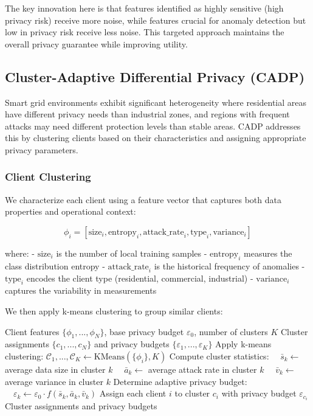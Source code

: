 \documentclass{ieeeaccess}
\theoremstyle{definition}
\begin{document}
The key innovation here is that features identified as highly sensitive (high privacy risk) receive more noise, while features crucial for anomaly detection but low in privacy risk receive less noise. This targeted approach maintains the overall privacy guarantee while improving utility.

\subsection{Cluster-Adaptive Differential Privacy (CADP)}

Smart grid environments exhibit significant heterogeneity where residential areas have different privacy needs than industrial zones, and regions with frequent attacks may need different protection levels than stable areas. CADP addresses this by clustering clients based on their characteristics and assigning appropriate privacy parameters.

\subsubsection{Client Clustering}

We characterize each client using a feature vector that captures both data properties and operational context:

\begin{equation}
\phi_i = [\text{size}_i, \text{entropy}_i, \text{attack\_rate}_i, \text{type}_i, \text{variance}_i]
\end{equation}

where:
- $\text{size}_i$ is the number of local training samples
- $\text{entropy}_i$ measures the class distribution entropy
- $\text{attack\_rate}_i$ is the historical frequency of anomalies
- $\text{type}_i$ encodes the client type (residential, commercial, industrial)
- $\text{variance}_i$ captures the variability in measurements

We then apply k-means clustering to group similar clients:

\begin{algorithm}
\caption{Cluster-Adaptive Privacy Assignment}
\label{alg:cadp}
\begin{algorithmic}[1]
\REQUIRE Client features $\{\phi_1, ..., \phi_N\}$, base privacy budget $\varepsilon_0$, number of clusters $K$
\ENSURE Cluster assignments $\{c_1, ..., c_N\}$ and privacy budgets $\{\varepsilon_1, ..., \varepsilon_K\}$
\STATE Apply k-means clustering: $\mathcal{C}_1, ..., \mathcal{C}_K \leftarrow \text{KMeans}(\{\phi_i\}, K)$
    \STATE Compute cluster statistics:
    \STATE $\quad \bar{s}_k \leftarrow$ average data size in cluster $k$
    \STATE $\quad \bar{a}_k \leftarrow$ average attack rate in cluster $k$
    \STATE $\quad \bar{v}_k \leftarrow$ average variance in cluster $k$
    \STATE Determine adaptive privacy budget:
    \STATE $\quad \varepsilon_k \leftarrow \varepsilon_0 \cdot f(\bar{s}_k, \bar{a}_k, \bar{v}_k)$
\ENDFOR
\STATE Assign each client $i$ to cluster $c_i$ with privacy budget $\varepsilon_{c_i}$
\RETURN Cluster assignments and privacy budgets
\end{algorithmic}
\end{algorithm}
\end{document}
